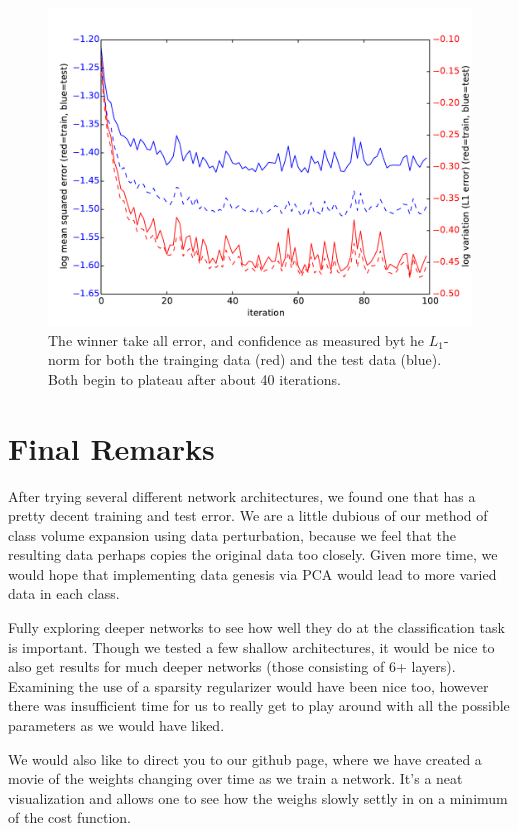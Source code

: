 \documentclass[prl,amsmath,amssymb,floatfix,superscriptaddress,notitlepage,twocolumn]{revtex4}
\begin{document}
\begin{figure}[ht!]
\label{EG2}
\centering
\includegraphics[width=1\textwidth]{error-3layer-48.pdf}
\caption{The winner take all error, and confidence as measured byt he $L_1$-norm for both the trainging data (red) and the test data (blue). Both begin to plateau after about 40 iterations. }
\end{figure}

\section{Final Remarks}
After trying several different network architectures, we found one that has a pretty decent training and test error. We are a little dubious of our method of class volume expansion using data perturbation, because we feel that the resulting data perhaps copies the original data too closely. Given more time, we would hope that implementing data genesis via PCA would lead to more varied data in each class.

Fully exploring deeper networks to see how well they do at the classification task is important. Though we tested a few shallow architectures, it would be nice to also get results for much deeper networks (those consisting of 6+ layers). Examining the use of a sparsity regularizer would have been nice too, however there was insufficient time for us to really get to play around with all the possible parameters as we would have liked.

We would also like to direct you to our github page, where we have created a movie of the weights changing over time as we train a network. It's a neat visualization and allows one to see how the weighs slowly settly in on a minimum of the cost function. 
\end{document}
